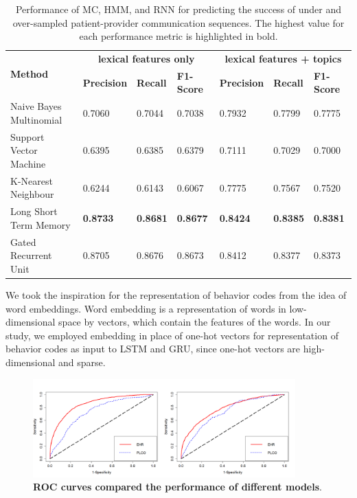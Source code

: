 \documentclass{amia}
\begin{document}
\begin{table}[ht]
\centering
\caption{Performance of MC, HMM, and RNN for predicting the success of under and over-sampled patient-provider communication sequences. The highest value for each performance metric is highlighted in bold.}
\label{tab:result_under_over_sampled}
  \begin{tabular}{|l|l|l|l|l|l|l|}
  \hline
   \multirow{2}{*}{\textbf{Method}} & \multicolumn{3}{|c|}{\textbf{lexical features only}} & \multicolumn{3}{|c|}{\textbf{lexical features + topics}} \\\cline{2-7}
   & \textbf{Precision}  & \textbf{Recall} & \textbf{F1-Score} & \textbf{Precision}  & \textbf{Recall} & \textbf{F1-Score}\\ \hline    
    
 Naive Bayes Multinomial & 0.7060 & 0.7044 & 0.7038 & 0.7932 & 0.7799 & 0.7775 \\ \hline
 Support Vector Machine & 0.6395 & 0.6385 & 0.6379 & 0.7111 & 0.7029 & 0.7000\\ \hline
 K-Nearest Neighbour & 0.6244 & 0.6143 & 0.6067 & 0.7775 & 0.7567 & 0.7520\\ \hline
 Long Short Term Memory & \textbf{0.8733} & \textbf{0.8681} & \textbf{0.8677} & \textbf{0.8424} & \textbf{0.8385} & \textbf{0.8381}\\ \hline
 Gated Recurrent Unit & 0.8705 & 0.8676 & 0.8673 & 0.8412 & 0.8377 & 0.8373\\ \hline 
  \end{tabular}
\end{table} 

We took the inspiration for the representation of behavior codes from the idea of word embeddings. Word embedding is a representation of words in
low-dimensional space by vectors, which contain the features of the words. In our study, we employed embedding in place of one-hot vectors for representation of behavior codes as input to LSTM and
GRU, since one-hot vectors are high-dimensional and sparse. 

\begin{figure}[!htb]
    \centering
    \includegraphics[width=0.90\textwidth]{figures/roc-curves.png}
    \caption{\textbf{ROC curves compared the performance of different models}.}
    \label{fig:roc-curves}
\end{figure}
\end{document}
